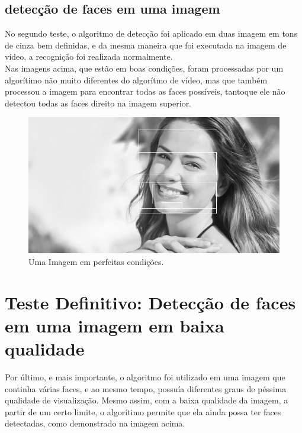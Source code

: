 \documentclass{article}
\begin{document}
	\subsection{detecção de faces em uma imagem}
	No segundo teste, o algoritmo de detecção foi aplicado em duas imagem em tons de cinza bem definidas, e da mesma maneira que foi executada na imagem de vídeo, a recognição foi realizada normalmente.\\
	Nas imagens acima, que estão em boas condições, foram processadas por um algorítimo não muito diferentes do algorítmo de vídeo, mas que também processou a imagem para encontrar todas as faces possíveis, tantoque ele não detectou todas as faces direito na imagem superior.
	\vspace{4mm}
	\begin{figure}
		\centering
		\includegraphics[scale = 0.4]{Face_track3.jpg}
		\caption{Uma Imagem em perfeitas condições.}
	\end{figure}
	\vspace{4mm}
	
	\newpage
	\section{Teste Definitivo: Detecção de faces em uma imagem em baixa qualidade}
	Por último, e mais importante, o algoritmo foi utilizado em uma imagem que continha várias faces, e ao mesmo tempo, possuía diferentes graus de péssima qualidade de visualização. Mesmo assim, com a baixa qualidade da imagem, a partir de um certo limite, o algorítimo permite que ela ainda possa ter faces detectadas, como demonstrado na imagem acima. 
	
\end{document}
